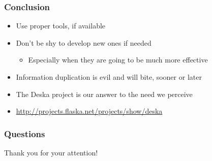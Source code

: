 \documentclass{beamer}
\begin{document}
\begin{frame}[fragile]
\frametitle{Conclusion}
\begin{itemize}
    \item Use proper tools, if available
    \item Don't be shy to develop new ones if needed
        \begin{itemize}
            \item Especially when they are going to be much more effective
        \end{itemize}
    \item Information duplication is evil and will bite, sooner or later
    \item The Deska project is our answer to the need we perceive
    \item \url{http://projects.flaska.net/projects/show/deska}
\end{itemize}
\end{frame}


\begin{frame}[fragile]
\frametitle{Questions}
\begin{center}
Thank you for your attention!
\end{center}
\end{frame}
\end{document}
